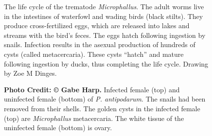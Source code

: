 \documentclass[
  letterpaper,
]{book}
\begin{document}
\begin{figure}


\caption[The life cycle of the trematode
\emph{Microphallus}]{\label{fig-4.1}The life cycle of the trematode
\emph{Microphallus}. The adult worms live in the intestines of waterfowl
and wading birds (black stilts). They produce cross-fertilized eggs,
which are released into lakes and streams with the bird's feces. The
eggs hatch following ingestion by snails. Infection results in the
asexual production of hundreds of cysts (called metacercaria). These
cysts ``hatch'' and mature following ingestion by ducks, thus completing
the life cycle. Drawing by Zoe M Dinges.}

\end{figure}%

\begin{figure}


\caption[Infected female (top) and uninfected female (bottom) of
\emph{P. antipodarum}]{\label{fig-4.2}\textbf{Photo Credit: © Gabe
Harp.} Infected female (top) and uninfected female (bottom) of \emph{P.
antipodarum}. The snails had been removed from their shells. The golden
cysts in the infected female (top) are \emph{Microphallus} metacercaria.
The white tissue of the uninfected female (bottom) is ovary.}

\end{figure}%
\end{document}
